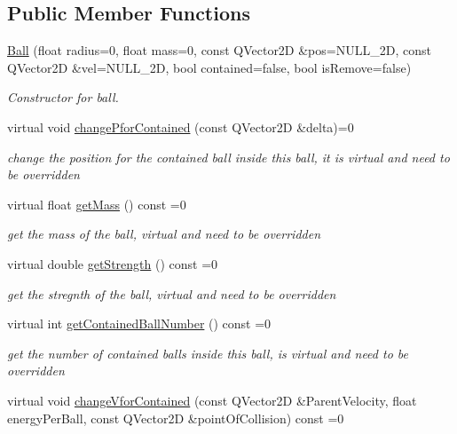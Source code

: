 \subsection*{Public Member Functions}
\begin{DoxyCompactItemize}
\item 
\mbox{\hyperlink{class_ball_a52038e026ee4d3c960ec10e84465bfe2}{Ball}} (float radius=0, float mass=0, const Q\+Vector2D \&pos=N\+U\+L\+L\+\_\+2D, const Q\+Vector2D \&vel=N\+U\+L\+L\+\_\+2D, bool contained=false, bool is\+Remove=false)
\begin{DoxyCompactList}\small\item\em Constructor for ball. \end{DoxyCompactList}\item 
virtual void \mbox{\hyperlink{class_ball_a86aa99bb9b244c4ec9193f8ac09c6e8e}{change\+Pfor\+Contained}} (const Q\+Vector2D \&delta)=0
\begin{DoxyCompactList}\small\item\em change the position for the contained ball inside this ball, it is virtual and need to be overridden \end{DoxyCompactList}\item 
virtual float \mbox{\hyperlink{class_ball_ab755ce741a2f0b652f499d183376be04}{get\+Mass}} () const =0
\begin{DoxyCompactList}\small\item\em get the mass of the ball, virtual and need to be overridden \end{DoxyCompactList}\item 
virtual double \mbox{\hyperlink{class_ball_ab659c8dceb67abdd09423814d4fc879e}{get\+Strength}} () const =0
\begin{DoxyCompactList}\small\item\em get the stregnth of the ball, virtual and need to be overridden \end{DoxyCompactList}\item 
virtual int \mbox{\hyperlink{class_ball_a13794c8d0e0863301a5f321a617542f6}{get\+Contained\+Ball\+Number}} () const =0
\begin{DoxyCompactList}\small\item\em get the number of contained balls inside this ball, is virtual and need to be overridden \end{DoxyCompactList}\item 
virtual void \mbox{\hyperlink{class_ball_a43cfbf4dca89a94048b4d45b2eaf62e9}{change\+Vfor\+Contained}} (const Q\+Vector2D \&Parent\+Velocity, float energy\+Per\+Ball, const Q\+Vector2D \&point\+Of\+Collision) const =0

\end{DoxyCompactItemize}
